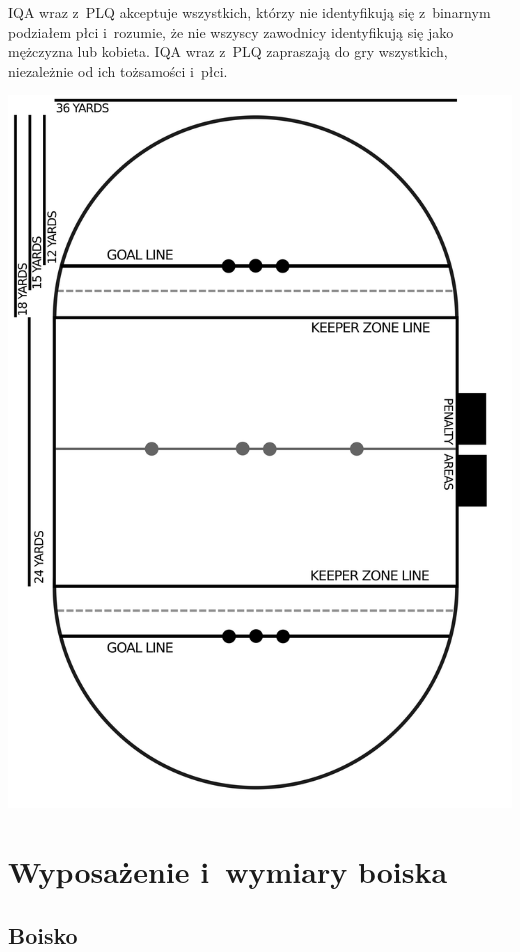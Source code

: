 \documentclass[12pt,a4paper]{article}
\begin{document}
IQA wraz z~PLQ akceptuje wszystkich, którzy nie identyfikują się z~binarnym podziałem płci i~rozumie, że nie wszyscy zawodnicy identyfikują się jako mężczyzna lub kobieta. IQA wraz z~PLQ zapraszają do gry wszystkich, niezależnie od ich tożsamości i~płci.

\thispagestyle{empty}
\includegraphics[width=0.8\paperwidth]{quidditch_pitch}
\restoregeometry

\pagebreak
\section{Wyposażenie i~wymiary boiska}

\subsection{Boisko}
\end{document}

